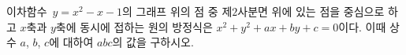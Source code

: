 이차함수~$y=x^2-x-1$의 그래프 위의 점 중 제$2$사분면 위에 있는 점을 중심으로 하고 $x$축과 $y$축에 동시에 접하는 원의 방정식은 $x^2+y^2+ax+by+c=0$이다. 이때 상수 $a$, $b$, $c$에 대하여 $abc$의 값을 구하시오.
